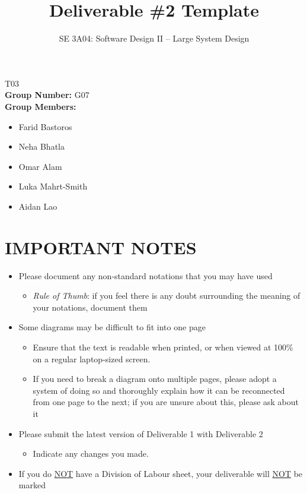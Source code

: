 \documentclass[]{article}
\title{Deliverable \#2 Template}
\author{SE 3A04: Software Design II -- Large System Design}
\date{}
\begin{document}
\maketitle	
{} T03\\
{\bf Group Number:} G07 \\
{\bf Group Members:} 
\begin{itemize}
	\item Farid Bastoros 
	\item Neha Bhatla
	\item Omar Alam
	\item Luka Mahrt-Smith
	\item Aidan Lao
\end{itemize}

\section*{IMPORTANT NOTES}
\begin{itemize}
	\item Please document any non-standard notations that you may have used
	\begin{itemize}
		\item \emph{Rule of Thumb}: if you feel there is any doubt surrounding the meaning of your notations, document them
	\end{itemize}
	\item Some diagrams may be difficult to fit into one page
	\begin{itemize}
		\item Ensure that the text is readable when printed, or when viewed at 100\% on a regular laptop-sized screen.
		\item If you need to break a diagram onto multiple pages, please adopt a system of doing so and thoroughly explain how it can be reconnected from one page to the next; if you are unsure about this, please ask about it
	\end{itemize}
	\item Please submit the latest version of Deliverable 1 with Deliverable 2
	\begin{itemize}
		\item Indicate any changes you made.
	\end{itemize}
	\item If you do \underline{NOT} have a Division of Labour sheet, your deliverable will \underline{NOT} be marked
\end{itemize}
\end{document}
